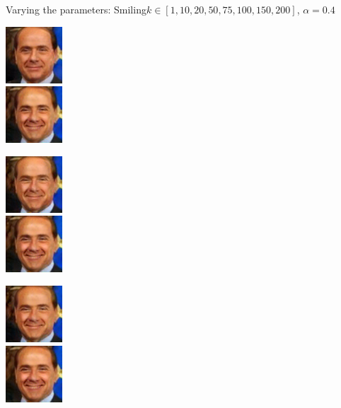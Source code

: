 \documentclass[11pt]{beamer}
\begin{document}
\begin{frame}{Varying the parameters: Smiling}{$k \in [1, 10, 20, 50, 75, 100, 150, 200]$, $\alpha=0.4$}
	\centering
	\begin{minipage}{81px}
		\includegraphics[width=80px]{../pictures/outputs/alpha_k/Smiling/alpha0.4/Silvio_Berlusconi_0023_alpha-0.4_k-12017-02-07_14-07-41.png}\\
		\includegraphics[width=80px]{../pictures/outputs/alpha_k/Smiling/alpha0.4/Silvio_Berlusconi_0023_alpha-0.4_k-752017-02-07_14-13-59.png}
	\end{minipage}%
	\begin{minipage}{81px}
		\includegraphics[width=80px]{../pictures/outputs/alpha_k/Smiling/alpha0.4/Silvio_Berlusconi_0023_alpha-0.4_k-102017-02-07_14-09-14.png}\\
		\includegraphics[width=80px]{../pictures/outputs/alpha_k/Smiling/alpha0.4/Silvio_Berlusconi_0023_alpha-0.4_k-1002017-02-07_14-15-38.png}
	\end{minipage}%
	\begin{minipage}{81px}
		\includegraphics[width=80px]{../pictures/outputs/alpha_k/Smiling/alpha0.4/Silvio_Berlusconi_0023_alpha-0.4_k-202017-02-07_14-10-46.png}\\
		\includegraphics[width=80px]{../pictures/outputs/alpha_k/Smiling/alpha0.4/Silvio_Berlusconi_0023_alpha-0.4_k-1502017-02-07_14-17-20.png}

\end{minipage}
\end{frame}
\end{document}

